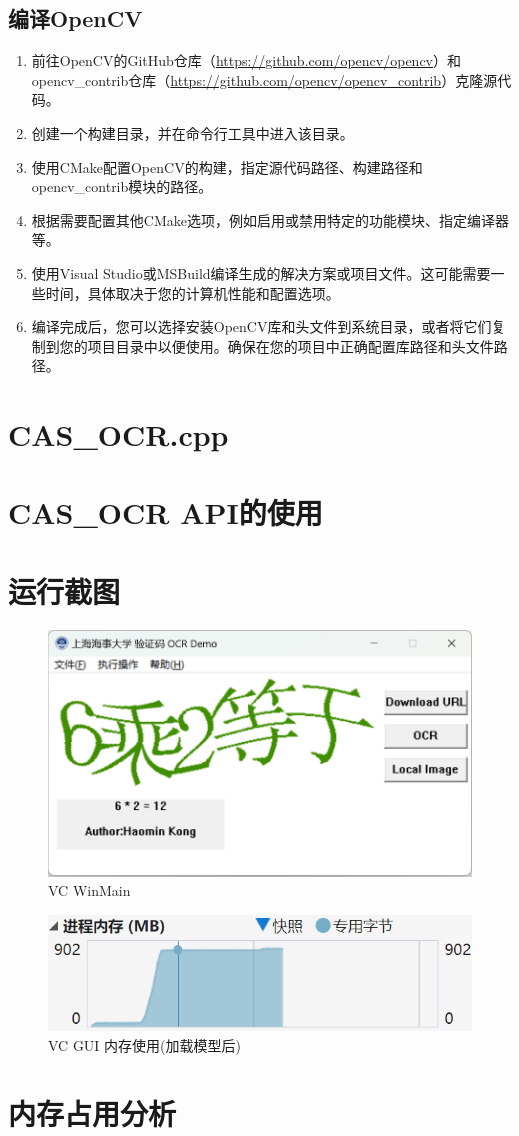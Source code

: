 \subsection{编译OpenCV}

\begin{enumerate}
	\item 前往OpenCV的GitHub仓库（\url{https://github.com/opencv/opencv}）和opencv\_contrib仓库（\url{https://github.com/opencv/opencv_contrib}）克隆源代码。
	\item 创建一个构建目录，并在命令行工具中进入该目录。
	\item 使用CMake配置OpenCV的构建，指定源代码路径、构建路径和opencv\_contrib模块的路径。
	\item 根据需要配置其他CMake选项，例如启用或禁用特定的功能模块、指定编译器等。
	\item 使用Visual Studio或MSBuild编译生成的解决方案或项目文件。这可能需要一些时间，具体取决于您的计算机性能和配置选项。
	\item 编译完成后，您可以选择安装OpenCV库和头文件到系统目录，或者将它们复制到您的项目目录中以便使用。确保在您的项目中正确配置库路径和头文件路径。
\end{enumerate}

\section{CAS\_OCR.cpp}

\section{CAS\_OCR API的使用}

\section{运行截图}

\begin{figure}
	\centering
	\includegraphics[width=0.7\linewidth]{Resources/Picture/vc_main}
	\caption{VC WinMain}
	\label{fig:vcmain}
\end{figure}

\begin{figure}
	\centering
	\includegraphics[width=0.7\linewidth]{Resources/Picture/vc_main_memory}
	\caption{VC GUI 内存使用(加载模型后)}
	\label{fig:vcmainmemory}
\end{figure}

\section{内存占用分析}



